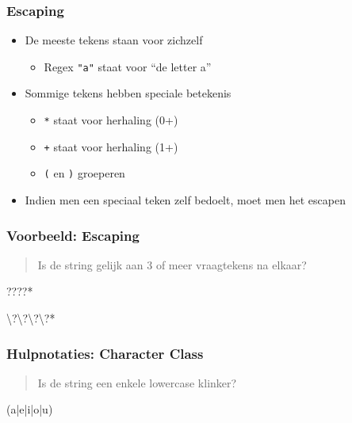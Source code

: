 \begin{frame}
  \frametitle{Escaping}
  \begin{itemize}
    \item De meeste tekens staan voor zichzelf
          \begin{itemize}
            \item Regex \texttt{"a"} staat voor ``de letter a''
          \end{itemize}
          \vskip2mm
    \item Sommige tekens hebben speciale betekenis
          \begin{itemize}
            \item \texttt{*} staat voor herhaling (0+)
            \item \texttt{+} staat voor herhaling (1+)
            \item \texttt{(} en \texttt{)} groeperen
          \end{itemize}
          \vskip2mm
    \item Indien men een speciaal teken zelf bedoelt, moet men het escapen
  \end{itemize}
\end{frame}

\begin{frame}
  \frametitle{Voorbeeld: Escaping}
  \begin{quote}
    Is de string gelijk aan 3 of meer vraagtekens na elkaar?
  \end{quote}
  \vskip2mm
  \begin{center} \ttfamily
    ????*
  \end{center}
  \vskip2mm
  \begin{center} \ttfamily
    \textbackslash?\textbackslash?\textbackslash?\textbackslash?*
  \end{center}
\end{frame}

\begin{frame}
  \frametitle{Hulpnotaties: Character Class}
  \begin{quote}
    Is de string een enkele lowercase klinker?
  \end{quote}
  \vskip2mm
  \begin{center} \ttfamily
    (a|e|i|o|u)
  \end{center}
  \vskip2mm
  \begin{center} \ttfamily
    [aeiou]
  \end{center}
\end{frame}


